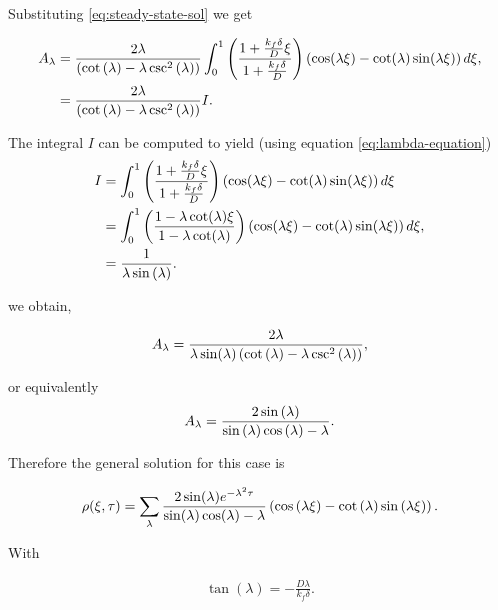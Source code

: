 Substituting \ref{eq:steady-state-sol} we get

\begin{align}
A_{\lambda} &= \frac{2\lambda}{\left({\cot\left({\lambda}\right) -  \lambda \csc^2\left({\lambda}\right)}\right)}\int_0^1 \left({\frac{1+\frac{k_f\delta}{D}\xi}{1+\frac{k_f\delta}{D}}}\right)\left({\cos(\lambda \xi) - \cot(\lambda) \sin(\lambda\xi)}\right)d\xi,\\
&= \frac{2\lambda}{\left({\cot\left({\lambda}\right) -  \lambda \csc^2\left({\lambda}\right)}\right)}I.
\end{align}

  
The integral $I$ can be computed to yield (using equation \ref{eq:lambda-equation})
\begin{align}
I &= \int_0^1 \left({\frac{1+\frac{k_f\delta}{D}\xi}{1+\frac{k_f\delta}{D}}}\right)\left({\cos(\lambda \xi) - \cot(\lambda) \sin(\lambda\xi)}\right)d\xi\\
&= \int_0^1 \left({\frac{1-\lambda \cot(\lambda)\xi}{1-\lambda \cot(\lambda)}}\right)\left({\cos(\lambda \xi) - \cot(\lambda) \sin(\lambda\xi)}\right)d\xi,\\
&= \frac{1}{\lambda\sin\left({\lambda}\right)}.
\end{align}

 we obtain,



\begin{align}
A_{\lambda} = \frac{2\lambda}{\lambda \sin(\lambda)\left({\cot\left({\lambda}\right) -  \lambda \csc^2\left({\lambda}\right)}\right)},
\end{align}

or equivalently
\begin{align}
A_{\lambda} = \frac{2 \sin\left({\lambda}\right)}{\sin\left({\lambda}\right)\cos\left({\lambda}\right)-\lambda}.
\end{align}

Therefore the general solution for this case is

\begin{align}
	\rho(\xi,\tau) = \sum_\lambda  \frac{2\sin(\lambda)e^{-\lambda^2\tau}}{\sin(\lambda)\cos(\lambda)-\lambda}\left({\cos{(\lambda\xi)} - \cot\left({\lambda}\right)\sin\left({\lambda\xi}\right)}\right).
\end{align}

With 

\begin{align}
	\tan(\lambda) = -\frac{D\lambda}{k_f\delta}.
\end{align}

